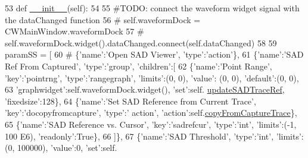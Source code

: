 \begin{DoxyCode}
53     \textcolor{keyword}{def }\hyperlink{classsoftware_1_1chipwhisperer_1_1capture_1_1scopes_1_1cwhardware_1_1ChipWhispererSAD_1_1ChipWhispererSAD_a86b23ff400135b2f4da21767740ca831}{\_\_init\_\_}(self):
54 
55         \textcolor{comment}{#TODO: connect the waveform widget signal with the dataChanged function}
56         \textcolor{comment}{# self.waveformDock = CWMainWindow.waveformDock}
57         \textcolor{comment}{# self.waveformDock.widget().dataChanged.connect(self.dataChanged)}
58 
59         paramSS = [
60                 \textcolor{comment}{# \{'name':'Open SAD Viewer', 'type':'action'\},}
61                  \{\textcolor{stringliteral}{'name'}:\textcolor{stringliteral}{'SAD Ref From Captured'}, \textcolor{stringliteral}{'type'}:\textcolor{stringliteral}{'group'}, \textcolor{stringliteral}{'children'}:[
62                     \{\textcolor{stringliteral}{'name'}:\textcolor{stringliteral}{'Point Range'}, \textcolor{stringliteral}{'key'}:\textcolor{stringliteral}{'pointrng'}, \textcolor{stringliteral}{'type'}:\textcolor{stringliteral}{'rangegraph'}, \textcolor{stringliteral}{'limits'}:(0, 0), \textcolor{stringliteral}{'value'}:
      (0, 0), \textcolor{stringliteral}{'default'}:(0, 0),
63                                            \textcolor{stringliteral}{'graphwidget'}:self.waveformDock.widget(), \textcolor{stringliteral}{'set'}:self.
      \hyperlink{classsoftware_1_1chipwhisperer_1_1capture_1_1scopes_1_1cwhardware_1_1ChipWhispererSAD_1_1ChipWhispererSAD_a872860464c98eb51d9b7ecaed920a475}{updateSADTraceRef}, \textcolor{stringliteral}{'fixedsize'}:128\},
64                     \{\textcolor{stringliteral}{'name'}:\textcolor{stringliteral}{'Set SAD Reference from Current Trace'}, \textcolor{stringliteral}{'key'}:\textcolor{stringliteral}{'docopyfromcapture'}, \textcolor{stringliteral}{'type'}:\textcolor{stringliteral}{'
      action'}, \textcolor{stringliteral}{'action'}:self.\hyperlink{classsoftware_1_1chipwhisperer_1_1capture_1_1scopes_1_1cwhardware_1_1ChipWhispererSAD_1_1ChipWhispererSAD_a4662dfc6b5ca6946ac5592d0dfa5be38}{copyFromCaptureTrace}\},
65                     \{\textcolor{stringliteral}{'name'}:\textcolor{stringliteral}{'SAD Reference vs. Cursor'}, \textcolor{stringliteral}{'key'}:\textcolor{stringliteral}{'sadrefcur'}, \textcolor{stringliteral}{'type'}:\textcolor{stringliteral}{'int'}, \textcolor{stringliteral}{'limits'}:(-1, 100
      E6), \textcolor{stringliteral}{'readonly'}:\textcolor{keyword}{True}\},
66                     ]\},
67                 \{\textcolor{stringliteral}{'name'}:\textcolor{stringliteral}{'SAD Threshold'}, \textcolor{stringliteral}{'type'}:\textcolor{stringliteral}{'int'}, \textcolor{stringliteral}{'limits'}:(0, 100000), \textcolor{stringliteral}{'value'}:0, \textcolor{stringliteral}{'set'}:self.

\end{DoxyCode}
